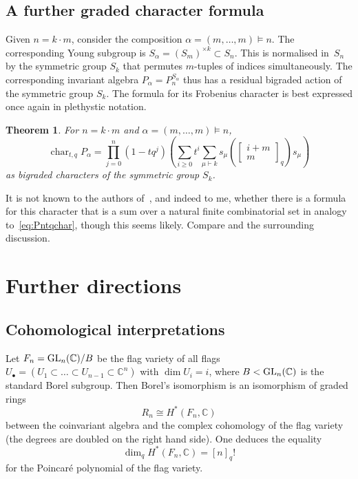 \documentclass[a4paper,11pt]{amsart}
\theoremstyle{plain}
\newtheorem{theorem}{Theorem}[section]
\theoremstyle{definition}
\newcommand{\C}{\mathbb{C}}
\DeclareMathOperator{\cha}{char}
\begin{document}
\subsection{A further graded character formula}

Given $n=k\cdot m$, consider the composition $\alpha=(m,\ldots, m)\vDash n$. The corresponding Young subgroup is 
$S_\alpha = (S_m)^{\times k}\subset S_n$. This is normalised in~$S_n$ by the symmetric group $S_k$ that permutes $m$-tuples of indices 
simultaneously. The corresponding invariant algebra $P_\alpha = P_n^{S_\alpha}$ thus has a residual bigraded action 
of the symmetric group $S_k$. The formula for its Frobenius character is best expressed once again in plethystic notation. 
\begin{theorem} \cite[Cor.~5,8, Ex.~5.10]{LR} For  $n=k\cdot m$ and $\alpha=(m,\ldots, m)\vDash n$, 
\[\cha_{t,q} P_\alpha =  \prod_{j=0}^n(1-t q^j)\left(\sum_{i\geq 0} t^i \sum_{\mu\vdash k}s_\mu\left(\left[\!\!\begin{array}{c} i+m \\ m \end{array}\!\!\right]_q\right)s_\mu \right)\] 
as bigraded characters of the symmetric group $S_k$. 
\label{thm:fabianetal}
\end{theorem}
It is not known to the authors of~\cite{LR}, and indeed to me, whether there is a formula for this character that is a sum over 
a natural finite combinatorial set in analogy to~\eqref{eq:Pntqchar}, though this seems likely. Compare \cite[Prop.~5.21]{LR} and the surrounding discussion. 

\section{Further directions}

\subsection{Cohomological interpretations}\label{sec:cohom} Let $F_n = {\rm GL}_n(\C)/B$ be the flag variety of all flags $U_\bullet=(U_1\subset\ldots \subset U_{n-1} \subset \C^n)$ with $\dim U_i = i$, where
$B<{\rm GL}_n(\C)$ is the standard Borel subgroup. Then Borel's isomorphism is an isomorphism of graded rings
\[
R_n \cong H^*(F_n, \C)
\]
between the coinvariant algebra and the complex cohomology of the flag variety (the degrees are doubled on the right hand side). One deduces the equality
\[
\dim_{q}H^*(F_n, \C) = [n]_q!
\]
for the Poincar\'e polynomial of the flag variety. 
\end{document}
